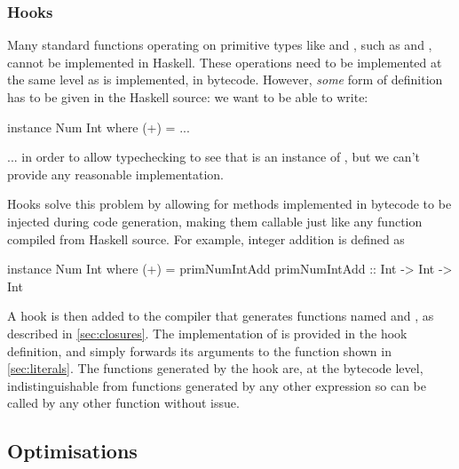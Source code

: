 \documentclass[dissertation.tex]{subfiles}
\begin{document}
{{        \subsubsection{Hooks}
        {

            Many standard functions operating on primitive types like  and , such as
            \haskell{(+)} and \haskell{(==)}, cannot be implemented in Haskell. These operations need to be implemented
            at the same level as  is implemented, in bytecode. However, \textit{some} form of definition
            has to be given in the Haskell source: we want to be able to write:

            \begin{haskellfigure}
            instance Num Int where
                (+) = ...
            \end{haskellfigure}

            ... in order to allow typechecking to see that  is an instance of , but we can't
            provide any reasonable implementation.

            Hooks solve this problem by allowing for methods implemented in bytecode to be injected during code
            generation, making them callable just like any function compiled from Haskell source. For example, integer
            addition is defined as 

            \begin{haskellfigure}
            instance Num Int where
                (+) = primNumIntAdd
            primNumIntAdd :: Int -> Int -> Int
            \end{haskellfigure}

            A hook is then added to the compiler that generates functions named  and
            , as described in \ref{sec:closures}. The implementation of
             is provided in the hook definition, and simply forwards its arguments to the
             function shown in \ref{sec:literals}. The functions generated by the hook are, at the
            bytecode level, indistinguishable from functions generated by any other expression so can be called by any
            other function without issue.



        }
    }
    \subsection{Optimisations}
    {
    
        

    }
}
\end{document}
